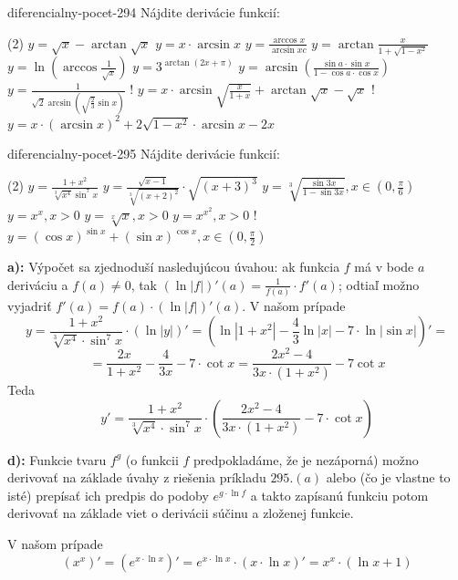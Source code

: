 \begin{defproblem}{diferencialny-pocet-294}
Nájdite derivácie funkcií:
\begin{tasks}(2)
    \task $y=\sqrt{x}-\arctan\sqrt{x}$
    \task $y=x\cdot\arcsin x$
    \task $y=\frac{\arccos x}{\arcsin xc}$
    \task $y=\arctan \frac{x}{1+\sqrt{1-x^2}}$
    \task $y=\ln (\arccos \frac{1}{\sqrt{x}})$
    \task $y=3^{\arctan(2x+\pi)}$
    \task $y=\arcsin(\frac{\sin a\cdot \sin x}{1-\cos a\cdot\cos x})$
    \task $y=\frac{1}{\sqrt{2}\arcsin(\sqrt{\frac{2}{3}}\sin x)}$
    \task! $y=x\cdot\arcsin \sqrt{\frac{x}{1+x}}+\arctan \sqrt{x}-\sqrt{x}$
    \task! $y=x\cdot(\arcsin x)^2+2\sqrt{1-x^2}\cdot\arcsin x-2x$
\end{tasks}
\end{defproblem}

\begin{defproblem}{diferencialny-pocet-295}
Nájdite derivácie funkcií:
\begin{tasks}(2)
    \task $y=\frac{1+x^2}{\sqrt[3]{x^4}\sin^7 x}$
    \task $y=\frac{\sqrt{x-1}}{\sqrt[3]{(x+2)^2}}\cdot\sqrt{(x+3)^3}$
    \task $y=\sqrt[3]{\frac{\sin 3x}{1-\sin 3x}},x\in(0,\frac{\pi}{6})$
    \task $y=x^x,x>0$
    \task $y=\sqrt[x]{x},x>0$
    \task $y=x^{x^2},x>0$
    \task! $y=(\cos x)^{\sin x}+(\sin x)^{\cos x},x\in(0,\frac{\pi}{2})$
\end{tasks}

\begin{solution}
  \textbf{a):}
  Výpočet sa zjednoduší nasledujúcou úvahou: ak funkcia $f$ má v bode $a$
  deriváciu a $f(a)\neq 0$, tak $(\ln |f|)'(a)=\frac{1}{f(a)}\cdot f'(a)$;
  odtiaľ možno vyjadriť $f'(a)=f(a)\cdot (\ln |f|)'(a)$. V našom prípade
  \[
    y=\frac{1+x^2}{\sqrt[3]{x^4}\cdot\sin^7 x}\cdot (\ln |y|)'
    = (\ln |1+x^2|-\frac{4}{3}\ln |x|-7\cdot\ln |\sin x|)' =
  \]
  \[
    = \frac{2x}{1+x^2}-\frac{4}{3x}-7\cdot \cot x
    = \frac{2x^2-4}{3x\cdot (1+x^2)}-7\cot x
  \]
  Teda
  \[
    y'=\frac{1+x^2}{\sqrt[3]{x^4}\cdot \sin^7 x}\cdot
    (\frac{2x^2-4}{3x\cdot (1+x^2)}-7\cdot\cot x)
  \]

  \textbf{d):}
  Funkcie tvaru $f^g$ (o funkcii $f$ predpokladáme, že je nezáporná) možno
  derivovať na základe úvahy z riešenia príkladu $295.(a)$ alebo (čo je vlastne
  to isté) prepísať ich predpis do podoby $e^{g\cdot\ln f}$ a takto zapísanú
  funkciu potom derivovať na základe viet o derivácii súčinu a zloženej funkcie.

  V našom prípade
  \[
    (x^x)'=(e^{x\cdot\ln x})'=e^{x\cdot\ln x}\cdot(x\cdot\ln x)'
    = x^x\cdot(\ln x +1)
  \]
\end{solution}
\end{defproblem}

